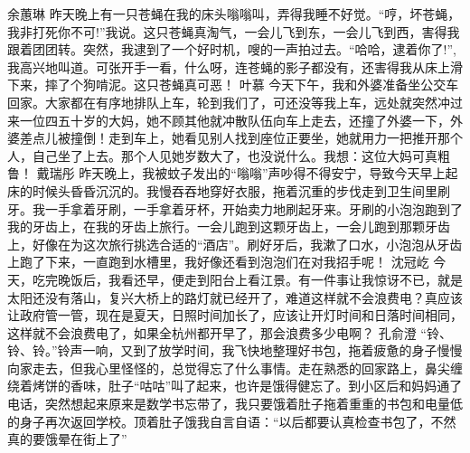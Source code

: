 \markdownRendererInterblockSeparator
{}\markdownRendererInterblockSeparator
{}余蕙琳\markdownRendererInterblockSeparator
{}昨天晚上有一只苍蝇在我的床头嗡嗡叫，弄得我睡不好觉。“哼，坏苍蝇，我非打死你不可!”我说。这只苍蝇真淘气，一会儿飞到东，一会儿飞到西，害得我跟着团团转。突然，我逮到了一个好时机，嗖的一声拍过去。“哈哈，逮着你了!”,我高兴地叫道。可张开手一看，什么呀，连苍蝇的影子都没有，还害得我从床上滑下来，摔了个狗啃泥。这只苍蝇真可恶！\markdownRendererInterblockSeparator
{}\markdownRendererInterblockSeparator
{}叶慕\markdownRendererInterblockSeparator
{}今天下午，我和外婆准备坐公交车回家。大家都在有序地排队上车，轮到我们了，可还没等我上车，远处就突然冲过来一位四五十岁的大妈，她不顾其他就冲散队伍向车上走去，还撞了外婆一下，外婆差点儿被撞倒！走到车上，她看见别人找到座位正要坐，她就用力一把推开那个人，自己坐了上去。那个人见她岁数大了，也没说什么。我想：这位大妈可真粗鲁！\markdownRendererInterblockSeparator
{}\markdownRendererInterblockSeparator
{}戴瑞彤\markdownRendererInterblockSeparator
{}昨天晚上，我被蚊子发出的“嗡嗡”声吵得不得安宁，导致今天早上起床的时候头昏昏沉沉的。我慢吞吞地穿好衣服，拖着沉重的步伐走到卫生间里刷牙。我一手拿着牙刷，一手拿着牙杯，开始卖力地刷起牙来。牙刷的小泡泡跑到了我的牙齿上，在我的牙齿上旅行。一会儿跑到这颗牙齿上，一会儿跑到那颗牙齿上，好像在为这次旅行挑选合适的“酒店”。刷好牙后，我漱了口水，小泡泡从牙齿上跑了下来，一直跑到水槽里，我好像还看到泡泡们在对我招手呢！\markdownRendererInterblockSeparator
{}\markdownRendererInterblockSeparator
{}沈冠屹\markdownRendererInterblockSeparator
{}今天，吃完晚饭后，我看还早，便走到阳台上看江景。有一件事让我惊讶不已，就是太阳还没有落山，复兴大桥上的路灯就已经开了，难道这样就不会浪费电？真应该让政府管一管，现在是夏天，日照时间加长了，应该让开灯时间和日落时间相同，这样就不会浪费电了，如果全杭州都开早了，那会浪费多少电啊？\markdownRendererInterblockSeparator
{}\markdownRendererInterblockSeparator
{}孔俞澄\markdownRendererInterblockSeparator
{}“铃、铃、铃。”铃声一响，又到了放学时间，我飞快地整理好书包，拖着疲惫的身子慢慢向家走去，但我心里怪怪的，总觉得忘了什么事情。走在熟悉的回家路上，鼻尖缠绕着烤饼的香味，肚子“咕咕”叫了起来，也许是饿得健忘了。到小区后和妈妈通了电话，突然想起来原来是数学书忘带了，我只要饿着肚子拖着重重的书包和电量低的身子再次返回学校。顶着肚子饿我自言自语：“以后都要认真检查书包了，不然真的要饿晕在街上了”\markdownRendererInterblockSeparator
